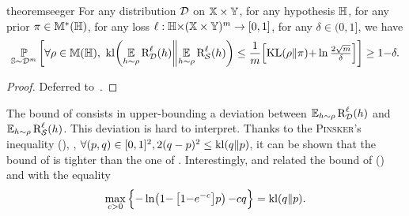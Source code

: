 \begin{restatable}{theorem}{seeger}\label{chap:pac-bayes:theorem:seeger}
For any distribution $\mathcal{D}$ on $\mathbb{X}\times\mathbb{Y}$, for any hypothesis $\mathbb{H}$, for any prior $\pi\in\mathbb{M}^{*}(\mathbb{H})$, for any loss $\ell: \mathbb{H}{\times}(\mathbb{X}\times\mathbb{Y})^m \to [0, 1]$, for any $\delta\in(0, 1]$, we have
\begin{align}
    \operatorname*{\mathbb{P}}_{\mathbb{S}\sim\mathcal{D}^m}\left[\forall\rho\in\mathbb{M}(\mathbb{H}),\   \operatorname{kl}\!\left(\operatorname*{\mathbb{E}}_{h\sim\rho}\text{R}^{\ell}_{\mathcal{D}}(h)\middle\|\operatorname*{\mathbb{E}}_{h\sim\rho}\text{R}^{\ell}_{\mathcal{S}}(h)\right) \le \frac{1}{m}\!\left[\operatorname{KL}(\rho\|\pi){+}\ln\tfrac{2\sqrt{m}}{\delta}\right]\right] \ge 1{-}\delta.\label{chap:pac-bayes:eq:seeger}
\end{align}
\end{restatable}
\begin{noaddcontents}\begin{proof}
Deferred to~.
\end{proof}\end{noaddcontents}

The bound of  consists in upper-bounding a deviation between $\operatorname*{\mathbb{E}}_{h\sim\rho}\text{R}^{\ell}_{\mathcal{D}}(h)$ and $\operatorname*{\mathbb{E}}_{h\sim\rho}\text{R}^{\ell}_{\mathcal{S}}(h)$.
This deviation is hard to interpret. 
Thanks to the \textsc{Pinsker}'s inequality (), \ie, $\forall (p,q)\in[0,1]^2, 2(q-p)^2\leq \operatorname{kl}(q\|p)$, it can be shown that the bound of  is tighter than the one of .
Interestingly, \citet[Proposition 2.1]{GermainLacasseLavioletteMarchand2009} and \citet[Proposition 6.2.2]{Lacasse2010} related the bound of \citeauthor{Catoni2007} () and  with the equality
\begin{align*}
    \max_{c>0}\Big\{{-}\ln\!\left( 1{-}\left[1{-}e^{{-}c}\right]\!p\right){-}c q \Big\}  = \operatorname{kl}(q\|p).
\end{align*}

